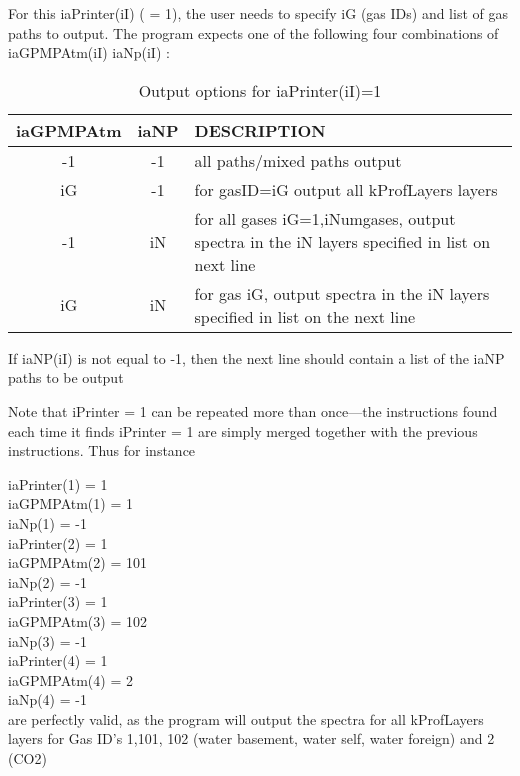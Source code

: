 \documentclass[12pt]{article}
\newcommand{\ttab}{\indent\indent}
\newlength{\colwidth}
\begin{document}
{{\vspace{0.1in}
\noindent For this iaPrinter(iI) ( = 1), the user needs to specify iG (gas 
IDs) and list of gas paths to output. The program expects one of the 
following four combinations of {\sf iaGPMPAtm(iI) iaNp(iI)} : \\
\vspace{0.2in}
\begin{small}
\begin{longtable}{|c|c|p{\colwidth}|}
\caption{Output options for iaPrinter(iI)=1}\\
\hline
iaGPMPAtm & iaNP & DESCRIPTION\\ \hline
-1    &  -1   & all paths/mixed paths output\\ \hline
iG    &  -1   & for gasID=iG  output all kProfLayers layers\\ \hline
-1    & iN    & for all gases iG=1,iNumgases, output spectra in the iN layers 
                specified in list on next line\\ \hline
iG    & iN    & for gas iG, output spectra in the iN layers specified in 
              list on the next line\\ \hline
\end{longtable}
\end{small}
If iaNP(iI) is not equal to -1, then the next line should contain a 
list of the iaNP paths to be output

Note that iPrinter = 1 can be repeated more than once---the 
instructions found each time it finds iPrinter = 1 are simply merged
together with the previous instructions.  Thus for instance

\medskip
\ttab iaPrinter(1) = 1\\
\ttab iaGPMPAtm(1) = 1\\
\ttab iaNp(1) = -1\\
\ttab iaPrinter(2) = 1\\
\ttab iaGPMPAtm(2) = 101\\
\ttab iaNp(2) = -1\\
\ttab iaPrinter(3) = 1\\
\ttab iaGPMPAtm(3) = 102\\
\ttab iaNp(3) = -1\\
\ttab iaPrinter(4) = 1\\
\ttab iaGPMPAtm(4) = 2\\
\ttab iaNp(4) = -1\\

\medskip
\noindent
are perfectly valid, as the program will output the spectra for all
kProfLayers layers for Gas ID's 1,101, 102 (water basement, water self, water
foreign) and 2 (CO2)

}}
\end{document}
